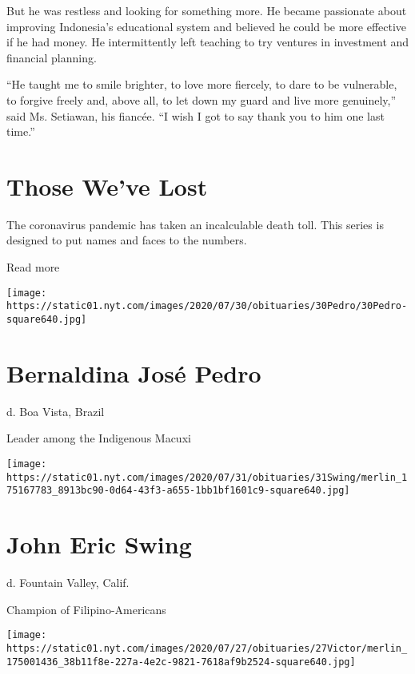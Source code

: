 But he was restless and looking for something more. He became passionate
about improving Indonesia's educational system and believed he could be
more effective if he had money. He intermittently left teaching to try
ventures in investment and financial planning.

``He taught me to smile brighter, to love more fiercely, to dare to be
vulnerable, to forgive freely and, above all, to let down my guard and
live more genuinely,'' said Ms. Setiawan, his fiancée. ``I wish I got to
say thank you to him one last time.''

\href{https://www.nytimes.com/interactive/2020/obituaries/people-died-coronavirus-obituaries.html?action=click\&pgtype=Article\&state=default\&region=BELOW_MAIN_CONTENT\&context=covid_obits_promo}{}

\hypertarget{those-weve-lost}{%
\section{Those We've Lost}\label{those-weve-lost}}

The coronavirus pandemic has taken an incalculable death toll. This
series is designed to put names and faces to the numbers.

Read more

\texttt{[image: https://static01.nyt.com/images/2020/07/30/obituaries/30Pedro/30Pedro-square640.jpg]}

\hypertarget{bernaldina-josuxe9-pedro}{%
\section{Bernaldina José Pedro}\label{bernaldina-josuxe9-pedro}}

d. Boa Vista, Brazil

Leader among the Indigenous Macuxi

\texttt{[image: https://static01.nyt.com/images/2020/07/31/obituaries/31Swing/merlin\_175167783\_8913bc90-0d64-43f3-a655-1bb1bf1601c9-square640.jpg]}

\hypertarget{john-eric-swing}{%
\section{John Eric Swing}\label{john-eric-swing}}

d. Fountain Valley, Calif.

Champion of Filipino-Americans

\texttt{[image: https://static01.nyt.com/images/2020/07/27/obituaries/27Victor/merlin\_175001436\_38b11f8e-227a-4e2c-9821-7618af9b2524-square640.jpg]}


